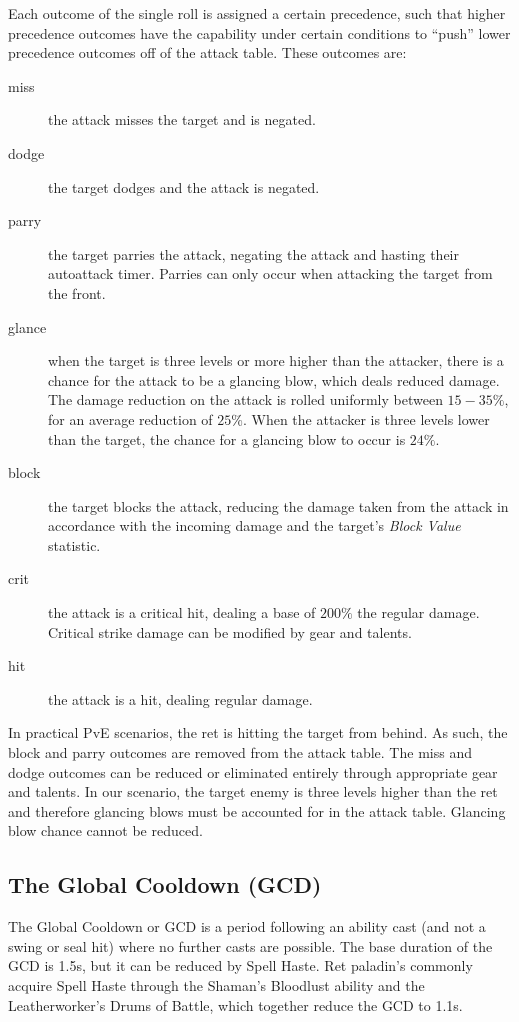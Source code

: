 \documentclass[letterpaper,11pt]{article}
\begin{document}
	Each outcome of the single roll is assigned a certain precedence, such that higher precedence outcomes have the capability under certain conditions to ``push'' lower precedence outcomes off of the attack table.
	These outcomes are:
	\begin{description}
		\item[miss] the attack misses the target and is negated.
		\item[dodge] the target dodges and the attack is negated.
		\item[parry] the target parries the attack, negating the attack and hasting their autoattack timer. Parries can only occur when attacking the target from the front.
		\item[glance] when the target is three levels or more higher than the attacker, there is a chance for the attack to be a glancing blow, which deals reduced damage. The damage reduction on the attack is rolled uniformly between $15 - 35 \%$, for an average reduction of $25\%$. When the attacker is three levels lower than the target, the chance for a glancing blow to occur is $24\%$. %
		\item[block] the target blocks the attack, reducing the damage taken from the attack in accordance with the incoming damage and the target's \emph{Block Value} statistic.
		\item[crit] the attack is a critical hit, dealing a base of $200\%$ the regular damage. Critical strike damage can be modified by gear and talents.
		\item[hit] the attack is a hit, dealing regular damage.
	\end{description}
	In practical PvE scenarios, the ret is hitting the target from behind.
	As such, the block and parry outcomes are removed from the attack table.
	The miss and dodge outcomes can be reduced or eliminated entirely through appropriate gear and talents.
	In our scenario, the target enemy is three levels higher than the ret and therefore glancing blows must be accounted for in the attack table.
	Glancing blow chance cannot be reduced.
	
	\subsection{The Global Cooldown (GCD)}
	The Global Cooldown or GCD is a period following an ability cast (and not a swing or seal hit) where no further casts are possible.
	The base duration of the GCD is 1.5s, but it can be reduced by Spell Haste.
	Ret paladin's commonly acquire Spell Haste through the Shaman's Bloodlust ability and the Leatherworker's Drums of Battle, which together reduce the GCD to 1.1s.
	
\end{document}
